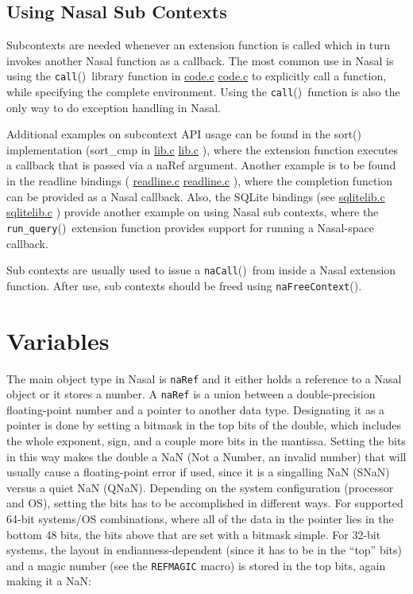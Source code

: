 \documentclass{article}
\newcommand{\todo}[1]{}
\newcommand{\type}[1]{\textcolor{type}{\tt #1}}
\newcommand{\func}[1]{\textcolor{func}{\tt #1}}
\newcommand{\localmacro}[1]{\textcolor{func}{\tt #1}}
\newcommand{\nasalsourcefile}[2][]{%
  \ifthenelse{\isempty{#1}}%
    {%
      \textcolor{source}{%
        \href{https://github.com/andyross/nasal/blob/master/src/#2}{#2}%
      }%
    }%
    {%
      \textcolor{source}{%
        \href{https://github.com/andyross/nasal/blob/master/src/#2\#L#1}{#2}%
      }%
    }%
}
\newcommand{\nasalapi}[1]{\func{#1}}
\newcommand{\fp}{\textcolor{func}{()}}
\begin{document}
\subsection{Using Nasal Sub Contexts}
\todo {document sub context API and usage, see cscope 'naSubContext(), and add code snippets'}

Subcontexts are needed whenever an extension function is called which in turn invokes another Nasal function as a callback. The most common use in Nasal is using the \nasalapi{call}\fp\ library function in \nasalsourcefile{code.c} to explicitly call a function, while specifying the complete environment. Using the \nasalapi{call}\fp\ function is also the only way to do exception handling in Nasal.

Additional examples on subcontext API usage can be found in the sort() implementation (sort\_cmp in \nasalsourcefile{lib.c}), where the extension function executes a callback that is passed via a naRef argument. Another example is to be found in the readline bindings (\nasalsourcefile{readline.c}), where the completion function can be provided as a Nasal callback. Also, the SQLite bindings (see \nasalsourcefile{sqlitelib.c}) provide another example on using Nasal sub contexts, where the \func{run\_query}\fp\ extension function provides support for running a Nasal-space callback.

Sub contexts are usually used to issue a \nasalapi{naCall}\fp\ from inside a Nasal extension function. After use, sub contexts should be freed using \nasalapi{na\-Free\-Context}\fp.

\section{Variables}
\todo{we can also look at automating bytefield'ing by dumping Nasal internals directly to Latex}
The main object type in Nasal is \type{naRef} and it either holds a reference to a Nasal object or it stores a number.  A \type{naRef} is a union between a double-precision floating-point number and a pointer to another data type.  Designating it as a pointer is done by setting a bitmask in the top bits of the double, which includes the whole exponent, sign, and a couple more bits in the mantissa.  Setting the bits in this way makes the double a NaN (Not a Number, an invalid number) that will usually cause a floating-point error if used, since it is a singalling NaN (SNaN) versus a quiet NaN (QNaN).  Depending on the system configuration (processor and OS), setting the bits has to be accomplished in different ways.  For supported 64-bit systems/OS combinations, where all of the data in the pointer lies in the bottom 48 bits, the bits above that are set with a bitmask simple.  For 32-bit systems, the layout in endianness-dependent (since it has to be in the ``top'' bits) and a magic number (see the \localmacro{REFMAGIC} macro) is stored in the top bits, again making it a NaN:
\end{document}
